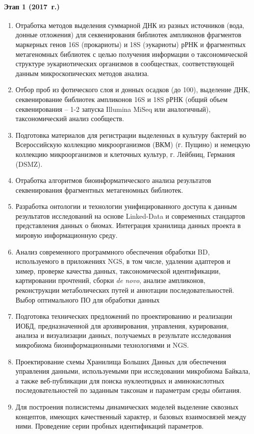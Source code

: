 \documentclass[a4paper,12pt,openany,final]{extreport}
\makeatletter
\newcommand\theyear{2017}
\def\vhrulefill#1{\leavevmode\leaders\hrule\@height#1\hfill \kern\z@}
\newcommand\bottomrule{\noindent\vhrulefill{2pt}}
\makeatother
\begin{document}
\paragraph{Этап 1 (\theyear~г.)}
\begin{enumerate}
\itemsep=1pt plus 0.3pt minus 0.1pt
\item Отработка методов выделения суммарной ДНК из разных
  источников (вода, донные отложения) для секвенирования библиотек
  ампликонов фрагментов маркерных генов 16S (прокариоты) и 18S
  (эукариоты) рРНК и фрагментных метагеномных библиотек с целью
  получения информации о таксономической структуре эукариотических
  организмов в сообществах, соответствующей данным микроскопических
  методов анализа.

\item  Отбор проб из фотического слоя и донных осадков (до 100), выделение
ДНК, секвенирование библиотек ампликонов 16S и 18S рРНК (общий объем
секвенирования -- 1-2 запуска Illumina MiSeq или аналогичный),
таксономический анализ сообществ.

\item  Подготовка материалов для регистрации выделенных в культуру бактерий
во Всероссийскую коллекцию микроорганизмов (ВКМ) (г. Пущино) и немецкую
коллекцию микроорганизмов и клеточных культур, г. Лейбниц, Германия
(DSMZ).

\item Отработка алгоритмов биоинформатического анализа результатов
секвенирования фрагментных метагеномных библиотек.

\item  Разработка онтологии и технологии унифицированного доступа к данным
результатов исследований на основе Linked-Data и современных стандартов
представления данных о биомах. Интеграция хранилища данных проекта в
мировую информационную среду.

\item  Анализ современного программного обеспечения обработки BD,
используемого в приложениях NGS, в том числе, удалении адаптеров и
химер, проверке качества данных, таксономической идентификации,
картировании прочтений, сборки \textit{de novo}, анализе ампликонов,
реконструкции метаболических путей и аннотации последовательностей.
Выбор оптимального ПО для обработки данных

\item  Подготовка технических предложений по проектированию и реализации
ИОБД, предназначенной для архивирования, управления, курирования,
анализа и визуализации данных, получаемых в результате исследования
микробиома биоинформационными технологиями и NGS.

\item  Проектирование схемы Хранилища Больших Данных для обеспечения
управления данными, используемыми при исследовании микробиома Байкала, а
также веб-публикации для поиска нуклеотидных и аминокислотных
последовательностей по заданным таксонам и параметрам среды обитания.

\item  Для построения полисистемы динамических моделей выделение сквозных
концептов, имеющих качественный характер, и базовых взаимосвязей между
ними. Проведение серии пробных идентификаций параметров.\strut
\end{enumerate}


\end{document}
